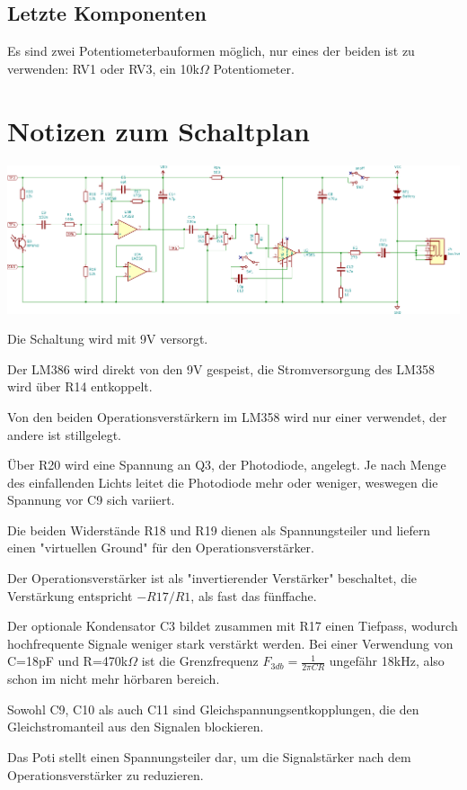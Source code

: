 \documentclass[]{article}
\begin{document}
\subsection{Letzte Komponenten}
Es sind zwei Potentiometerbauformen möglich, nur eines der beiden ist zu verwenden: RV1 oder RV3, ein 10k$\Omega$ Potentiometer.

\section{Notizen zum Schaltplan}
\includegraphics[width=1.0\linewidth]{Schaltplan.png}

Die Schaltung wird mit 9V versorgt.

Der LM386 wird direkt von den 9V gespeist, die Stromversorgung des LM358 wird über R14 entkoppelt.

Von den beiden Operationsverstärkern im LM358 wird nur einer verwendet, der andere ist stillgelegt.

Über R20 wird eine Spannung an Q3, der Photodiode, angelegt. Je nach Menge des einfallenden Lichts leitet die Photodiode mehr oder weniger, weswegen die Spannung vor C9 sich variiert. 

Die beiden Widerstände R18 und R19 dienen als Spannungsteiler und liefern einen "virtuellen Ground" für den Operationsverstärker.

Der Operationsverstärker ist als "invertierender Verstärker" beschaltet, die Verstärkung entspricht $-R17/R1$, als fast das fünffache.

Der optionale Kondensator C3 bildet zusammen mit R17 einen Tiefpass, wodurch hochfrequente Signale weniger stark verstärkt werden. Bei einer Verwendung von C=18pF und R=470k$\Omega$ ist die Grenzfrequenz $F_{3db}=\frac{1}{2 \pi C R}$ ungefähr 18kHz, also schon im nicht mehr hörbaren bereich.

Sowohl C9, C10 als auch C11 sind Gleichspannungsentkopplungen, die den Gleichstromanteil aus den Signalen blockieren.

Das Poti stellt einen Spannungsteiler dar, um die Signalstärker nach dem Operationsverstärker zu reduzieren.
\end{document}
